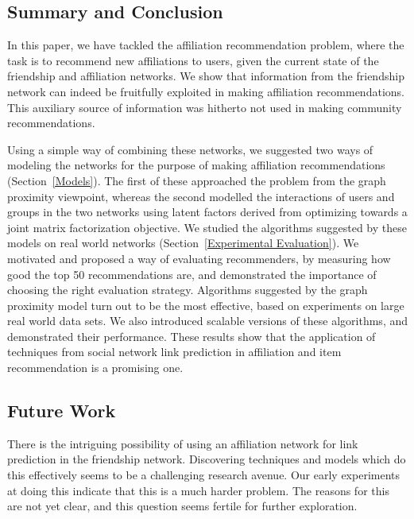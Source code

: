 \subsection{Summary and Conclusion}
In this paper, we have tackled the affiliation recommendation problem, where the task is to recommend new affiliations to users, given the current state of the friendship and affiliation networks. We show that information from the friendship network can indeed be fruitfully exploited in making affiliation recommendations. This auxiliary source of information was hitherto not used in making community recommendations.

Using a simple way of combining these networks, we suggested two ways of modeling the networks for the purpose of making affiliation recommendations (Section~\ref{Models}). The first of these approached the problem from the graph proximity viewpoint, whereas the second modelled the interactions of users and groups in the two networks using latent factors derived from optimizing towards a joint matrix factorization objective. We studied the algorithms suggested by these models on real world networks (Section~\ref{Experimental Evaluation}). We motivated and proposed a way of evaluating recommenders, by measuring how good the top 50 recommendations are, and demonstrated the importance of choosing the right evaluation strategy. Algorithms suggested by the graph proximity model turn out to be the most effective, based on experiments on large real world data sets. We also introduced scalable versions of these algorithms, and demonstrated their performance. These results show that the application of techniques from social network link prediction in affiliation and item recommendation is a promising one.

\subsection{Future Work}
There is the intriguing possibility of using an affiliation network for link prediction in the friendship network. Discovering techniques and models which do this effectively seems to be a challenging research avenue. Our early experiments at doing this indicate that this is a much harder problem. The reasons for this are not yet clear, and this question seems fertile for further exploration.

